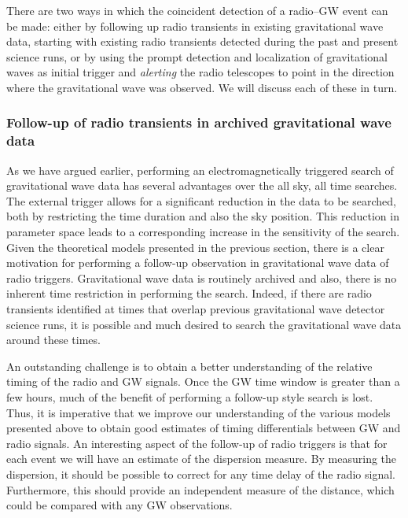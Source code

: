 \documentclass[epsf]{article}
\begin{document}
There are two ways in which the coincident detection of a radio--GW
event can be made: either by following up radio transients in existing
gravitational wave data, starting with existing radio transients
detected during the past and present science runs, or by using the
prompt detection and localization of gravitational waves as initial
trigger and {\it alerting} the radio telescopes to point in the
direction where the gravitational wave was observed.  We will discuss
each of these in turn.


\subsubsection{Follow-up of radio transients in archived gravitational wave data}

As we have argued earlier, performing an electromagnetically triggered
search of gravitational wave data has several advantages over the all
sky, all time searches.  The external trigger allows for a significant
reduction in the data to be searched, both by restricting the time
duration and also the sky position.  This reduction in parameter space leads
to a corresponding increase in the sensitivity of the search.  Given the
theoretical models presented in the previous section, there is a clear
motivation for performing a follow-up observation in gravitational wave
data of radio triggers.  Gravitational wave data is routinely archived and also, 
there is no inherent time restriction in performing the search. Indeed, if there
are radio transients identified at times that overlap previous
gravitational wave detector science runs, it is possible and much desired to
search the gravitational wave data around these times.

An outstanding challenge is to obtain a better understanding of the
relative timing of the radio and GW signals.  Once the GW time window is
greater than a few hours, much of the benefit of performing a follow-up style
search is lost.  Thus, it is imperative that we improve our
understanding of the various models presented above to obtain good
estimates of timing differentials between GW and radio signals.  An
interesting aspect of the follow-up of radio triggers is that for each event
we will have an estimate of the dispersion measure.  By measuring the
dispersion, it should be possible to correct for any time delay of the
radio signal.  Furthermore, this should provide an independent
measure of the distance, which could be compared with any GW
observations.
\end{document}

